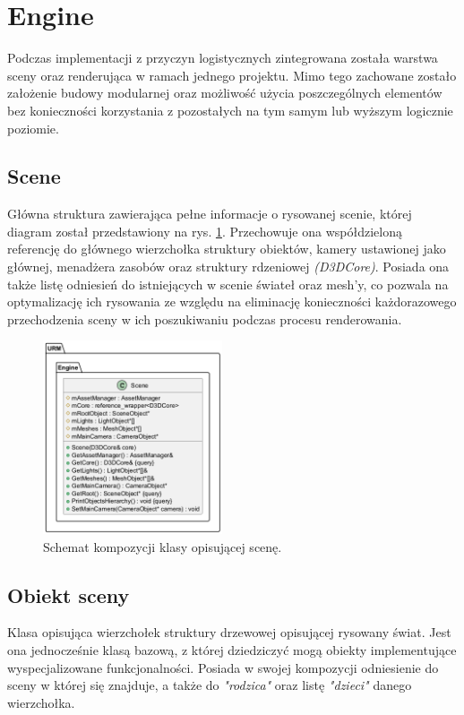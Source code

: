 	
\section{Engine}
	Podczas implementacji z przyczyn logistycznych zintegrowana została warstwa sceny oraz renderująca w ramach jednego projektu. Mimo tego zachowane zostało założenie budowy modularnej oraz możliwość użycia poszczególnych elementów bez konieczności korzystania z pozostałych na tym samym lub wyższym logicznie poziomie.
	
\subsection{Scene}
	Główna struktura zawierająca pełne informacje o rysowanej scenie, której diagram został przedstawiony na rys. \ref{UML_Scene}. Przechowuje ona współdzieloną referencję do głównego wierzchołka struktury obiektów, kamery ustawionej jako głównej, menadżera zasobów oraz struktury rdzeniowej \textit{(D3DCore)}. Posiada ona także listę odniesień do istniejących w scenie świateł oraz mesh'y, co pozwala na optymalizację ich rysowania ze względu na eliminację konieczności każdorazowego przechodzenia sceny w ich poszukiwaniu podczas procesu renderowania.
	
	\begin{figure}[h!]
		\centering
		\includegraphics[width=200px]{images/UML/scene.png}
		\caption{Schemat kompozycji klasy opisującej scenę.}
		\label{UML_Scene}
	\end{figure}
	
	
\subsection{Obiekt sceny}
	Klasa opisująca wierzchołek struktury drzewowej opisującej rysowany świat. Jest ona jednocześnie klasą bazową, z której dziedziczyć mogą obiekty implementujące wyspecjalizowane funkcjonalności. Posiada w swojej kompozycji odniesienie do sceny w której się znajduje, a także do \textit{"rodzica"} oraz listę \textit{"dzieci"} danego wierzchołka. 
	
